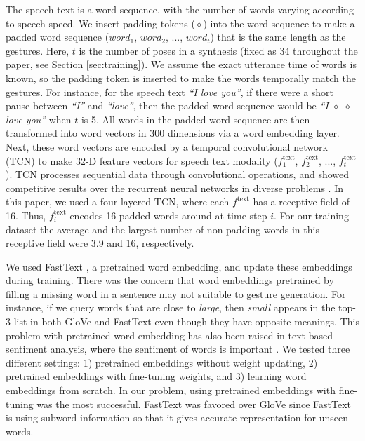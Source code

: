 \documentclass[acmtog]{acmart}
\begin{document}
The speech text is a word sequence, with the number of words varying according to speech speed. We insert padding tokens ($\diamond$) into the word sequence to make a padded word sequence (${word}_1$, ${word}_2$, ..., ${word}_t$) that is the same length as the gestures. Here, $t$ is the number of poses in a synthesis (fixed as 34 throughout the paper, see Section \ref{sec:training}). We assume the exact utterance time of words is known, so the padding token is inserted to make the words temporally match the gestures. For instance, for the speech text \textit{``I love you''}, if there were a short pause between \textit{``I''} and \textit{``love''}, then the padded word sequence would be \textit{``I $\diamond$ $\diamond$ love you''} when $t$ is 5. All words in the padded word sequence are then transformed into word vectors in 300 dimensions via a word embedding layer. Next, these word vectors are encoded by a temporal convolutional network (TCN) \cite{BaiTCN2018} to make 32-D feature vectors for speech text modality ($f_1^\textrm{text}$, $f_2^\textrm{text}$, ..., $f_t^\textrm{text}$). TCN processes sequential data through convolutional operations, and showed competitive results over the recurrent neural networks in diverse problems \cite{BaiTCN2018}. In this paper, we used a four-layered TCN, where each $f^\textrm{text}$ has a receptive field of 16. Thus, $f_i^\textrm{text}$ encodes 16 padded words around at time step $i$. For our training dataset the average and the largest number of non-padding words in this receptive field were 3.9 and 16, respectively. 

We used FastText \cite{bojanowski2016enriching}, a pretrained word embedding, and update these embeddings during training. There was the concern that word embeddings pretrained by filling a missing word in a sentence \cite{mikolov2013distributed} may not suitable to gesture generation. For instance, if we query words that are close to \textit{large}, then \textit{small} appears in the top-3 list in both GloVe \cite{pennington2014glove} and FastText \cite{bojanowski2016enriching} even though they have opposite meanings. This problem with pretrained word embedding has also been raised in text-based sentiment analysis, where the sentiment of words is important \cite{fu2018learning}. We tested three different settings: 1) pretrained embeddings without weight updating, 2) pretrained embeddings with fine-tuning weights, and 3) learning word embeddings from scratch. In our problem, using pretrained embeddings with fine-tuning was the most successful. FastText \cite{bojanowski2016enriching} was favored over GloVe \cite{pennington2014glove} since FastText is using subword information so that it gives accurate representation for unseen words.
\end{document}
